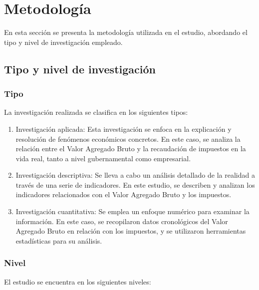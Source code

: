 \documentclass[
  letterpaper,
  DIV=11,
  numbers=noendperiod]{scrartcl}
\begin{document}
\hypertarget{sec-metodologuxeda}{%
\section{Metodología}\label{sec-metodologuxeda}}

En esta sección se presenta la metodología utilizada en el estudio,
abordando el tipo y nivel de investigación empleado.

\hypertarget{tipo-y-nivel-de-investigaciuxf3n}{%
\subsection{Tipo y nivel de
investigación}\label{tipo-y-nivel-de-investigaciuxf3n}}

\hypertarget{tipo}{%
\subsubsection{Tipo}\label{tipo}}

La investigación realizada se clasifica en los siguientes tipos:

\begin{enumerate}
\def\labelenumi{\alph{enumi}.}
\item
  Investigación aplicada: Esta investigación se enfoca en la explicación
  y resolución de fenómenos económicos concretos. En este caso, se
  analiza la relación entre el Valor Agregado Bruto y la recaudación de
  impuestos en la vida real, tanto a nivel gubernamental como
  empresarial.
\item
  Investigación descriptiva: Se lleva a cabo un análisis detallado de la
  realidad a través de una serie de indicadores. En este estudio, se
  describen y analizan los indicadores relacionados con el Valor
  Agregado Bruto y los impuestos.
\item
  Investigación cuantitativa: Se emplea un enfoque numérico para
  examinar la información. En este caso, se recopilaron datos
  cronológicos del Valor Agregado Bruto en relación con los impuestos, y
  se utilizaron herramientas estadísticas para su análisis.
\end{enumerate}

\hypertarget{nivel}{%
\subsubsection{Nivel}\label{nivel}}

El estudio se encuentra en los siguientes niveles:
\end{document}
